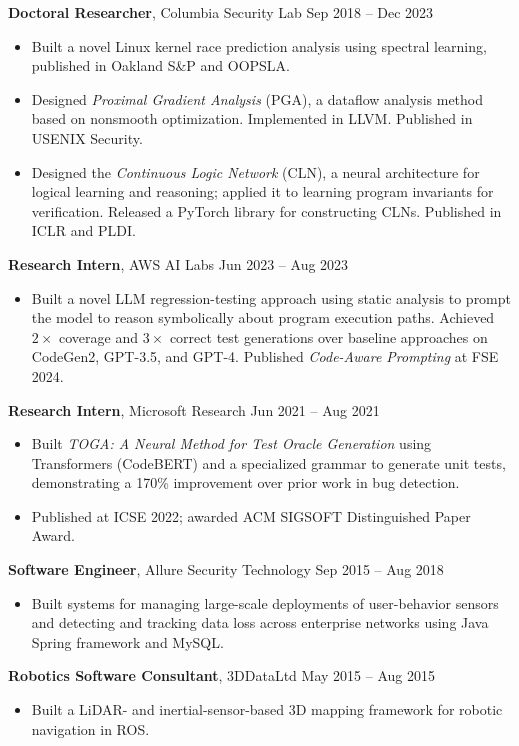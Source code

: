 \documentclass{article} %
\newcommand{\rjob}[2]{
  \hspace*{-0.3cm}
{\fontsize{10pt}{12pt}\selectfont #1} \hfill #2
\hspace*{-1.2cm}
}
\newenvironment{ritemize}{
\par\nopagebreak %
\vspace{-\parskip}
\hspace*{-0.8cm}
\begin{minipage}{1.05\linewidth}
\fontsize{10pt}{11pt}\selectfont
\vspace{0.1cm}
\begin{itemize}[itemsep=0pt,parsep=0pt,topsep=1pt,partopsep=0pt]
}{
\end{itemize}
\end{minipage}
\vspace{-0.1cm}
}
\newcommand{\ritem}{
\item[-]
}
\begin{document}
\rjob{\textbf{Doctoral Researcher}, Columbia Security Lab}{Sep 2018 -- Dec 2023}
\begin{ritemize}
    \ritem Built a novel Linux kernel race prediction analysis using spectral learning, published in Oakland S\&P and OOPSLA.
    \ritem Designed \textit{Proximal Gradient Analysis} (PGA), a dataflow analysis method based on nonsmooth optimization. Implemented in LLVM. Published in USENIX Security.
    \ritem Designed the \textit{Continuous Logic Network} (CLN), a neural architecture for logical learning and reasoning; applied it to learning program invariants for verification. Released a PyTorch library for constructing CLNs. Published in ICLR and PLDI.
\end{ritemize}

\rjob{\textbf{Research Intern}, AWS AI Labs}{Jun 2023 -- Aug 2023}
\begin{ritemize}
  \ritem Built a novel LLM regression-testing approach using static analysis to prompt the model to reason symbolically about program execution paths. Achieved $2\times$ coverage and $3\times$ correct test generations over baseline approaches on CodeGen2, GPT-3.5, and GPT-4. Published \textit{Code-Aware Prompting} at FSE 2024.
\end{ritemize}


\rjob{\textbf{Research Intern}, Microsoft Research}{Jun 2021 -- Aug 2021}
\begin{ritemize}
    \ritem Built \textit{TOGA: A Neural Method for Test Oracle Generation} using Transformers (CodeBERT) and a specialized grammar to generate unit tests, demonstrating a 170\% improvement over prior work in bug detection.
    \ritem Published at ICSE 2022; awarded ACM SIGSOFT Distinguished Paper Award.
\end{ritemize}

\rjob{\textbf{Software Engineer}, Allure Security Technology}{Sep 2015 -- Aug 2018}
\begin{ritemize}
\ritem Built systems for managing large-scale deployments of user-behavior sensors and detecting and tracking data loss across enterprise networks using Java Spring framework and MySQL.
\end{ritemize}

\rjob{\textbf{Robotics Software Consultant}, 3DDataLtd}{May 2015 -- Aug 2015}
\begin{ritemize}
\ritem Built a LiDAR- and inertial-sensor-based 3D mapping framework for robotic navigation in ROS.
\end{ritemize}
\end{document}
